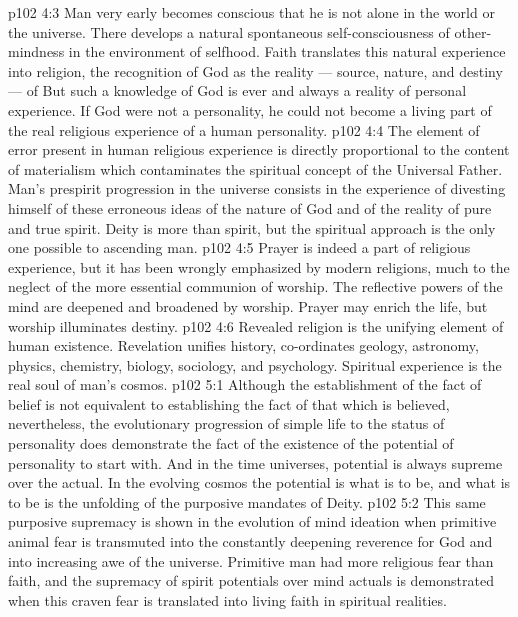 \vs p102 4:3 Man very early becomes conscious that he is not alone in the world or the universe. There develops a natural spontaneous self\hyp{}consciousness of other\hyp{}mindness in the environment of selfhood. Faith translates this natural experience into religion, the recognition of God as the reality --- source, nature, and destiny --- of  But such a knowledge of God is ever and always a reality of personal experience. If God were not a personality, he could not become a living part of the real religious experience of a human personality.
\vs p102 4:4 The element of error present in human religious experience is directly proportional to the content of materialism which contaminates the spiritual concept of the Universal Father. Man’s prespirit progression in the universe consists in the experience of divesting himself of these erroneous ideas of the nature of God and of the reality of pure and true spirit. Deity is more than spirit, but the spiritual approach is the only one possible to ascending man.
\vs p102 4:5 \pc Prayer is indeed a part of religious experience, but it has been wrongly emphasized by modern religions, much to the neglect of the more essential communion of worship. The reflective powers of the mind are deepened and broadened by worship. Prayer may enrich the life, but worship illuminates destiny.
\vs p102 4:6 \pc Revealed religion is the unifying element of human existence. Revelation unifies history, co\hyp{}ordinates geology, astronomy, physics, chemistry, biology, sociology, and psychology. Spiritual experience is the real soul of man’s cosmos.
\vs p102 5:1 Although the establishment of the fact of belief is not equivalent to establishing the fact of that which is believed, nevertheless, the evolutionary progression of simple life to the status of personality does demonstrate the fact of the existence of the potential of personality to start with. And in the time universes, potential is always supreme over the actual. In the evolving cosmos the potential is what is to be, and what is to be is the unfolding of the purposive mandates of Deity.
\vs p102 5:2 This same purposive supremacy is shown in the evolution of mind ideation when primitive animal fear is transmuted into the constantly deepening reverence for God and into increasing awe of the universe. Primitive man had more religious fear than faith, and the supremacy of spirit potentials over mind actuals is demonstrated when this craven fear is translated into living faith in spiritual realities.
